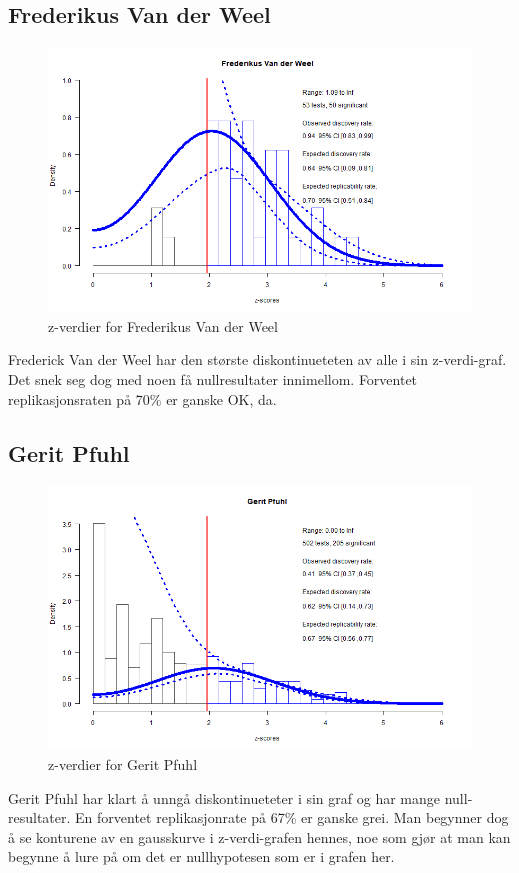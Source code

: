\documentclass[doc,norsk]{apa7}
\begin{document}
\subsection{Frederikus Van der Weel}
\begin{figure}[h!]
    \centering
    \includegraphics[width=\textwidth]{images/Frederikus Van der Weel.png}
    \caption{z-verdier for Frederikus Van der Weel}
\end{figure}
Frederick Van der Weel har den største diskontinueteten av alle i sin z-verdi-graf. Det snek seg dog med noen få nullresultater innimellom. Forventet replikasjonsraten på 70\% er ganske OK, da.

\subsection{Gerit Pfuhl}
\begin{figure}[h!]
    \centering
    \includegraphics[width=\textwidth]{images/Gerit Pfuhl.png}
    \caption{z-verdier for Gerit Pfuhl}
\end{figure}
Gerit Pfuhl har klart å unngå diskontinueteter i sin graf og har mange null-resultater. En forventet replikasjonrate på 67\% er ganske grei. Man begynner dog å se konturene av en gausskurve i z-verdi-grafen hennes, noe som gjør at man kan begynne å lure på om det er nullhypotesen som er i grafen her.
\end{document}
